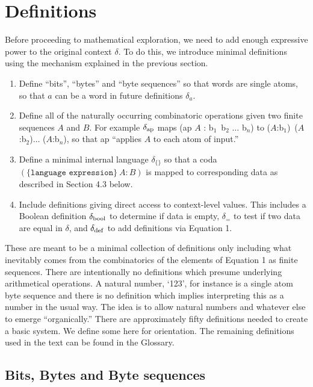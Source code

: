 \documentclass[11pt]{article}
\begin{document}
\section{Definitions}

     Before proceeding to mathematical exploration, we need to add enough expressive power to the original context $\delta$.  To do this, 
we introduce minimal definitions using the mechanism explained in the previous section.  

\begin{enumerate}
\item {Define ``bits'', ``bytes'' and ``byte sequences'' so that words are single atoms, so that $a$ can be a word in future definitions $\delta_a$.}
\item {Define all of the naturally occurring combinatoric operations given two finite sequences $A$ and $B$.  For example $\delta_{\rm ap}$
maps (ap $A$ : b$_1$\ b$_2$ $\dots$ b$_n$) to ($A$:b$_1$)\ ($A$:b$_2$)$\dots$ ($A$:b$_n$), so that ap ``applies $A$ to each atom of input.'' }
\item {Define a minimal internal language $\delta_{\{\}}$ so that a coda $(\{\texttt{language expression}\}\ A : B)$ is mapped to corresponding 
data as described in Section 4.3 below.}
\item {Include definitions giving direct access to context-level values.  This includes a Boolean definition $\delta_{\rm bool}$ to determine if data is empty, 
$\delta_{=}$ to test if two data are equal in $\delta$, and $\delta_{\rm def}$ to add definitions via Equation 1.} 
\end{enumerate}
These are meant to be a minimal collection of definitions only including what inevitably comes from the combinatorics of the elements of 
Equation 1 as finite sequences. 
There are intentionally no definitions which presume underlying arithmetical operations.  A natural number, 
`123', for instance is a single atom byte sequence and there is no definition which implies interpreting this as a number in the usual way.  The idea is
to allow natural numbers and whatever else to emerge ``organically.'' 
There are approximately fifty definitions needed to create a basic system.  We define some here for orientation.  The remaining definitions used 
in the text can be found in the Glossary.

\subsection{Bits, Bytes and Byte sequences}
\end{document}
